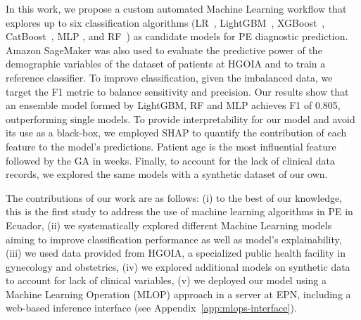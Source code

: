 \documentclass[diagnostics,article,accept,pdftex,moreauthors]{Definitions/mdpi}
\begin{document}
In this work, we propose a custom automated Machine Learning workflow
that explores up to six classification algorithms
(\ac{LR}~\cite{cox1958logistic}, LightGBM~\cite{ke2017lightgbm},
XGBoost~\cite{chen2016xgboost},
CatBoost~\cite{prokhorenkova2018catboost}, 
\ac{MLP} \cite{rumelhart1986backprop}, and
\ac{RF}~\cite{breiman2001randomforest}) as candidate models for
\ac{PE} diagnostic prediction. Amazon SageMaker was also used to
evaluate the predictive power of the demographic variables of the
dataset of patients at \ac{HGOIA} and to train a reference
classifier. To improve classification, given the imbalanced data, we
target the \ac{F1} metric to balance sensitivity and precision. Our
results show that an ensemble model formed by LightGBM, \ac{RF} and
\ac{MLP} achieves \ac{F1} of 0.805, outperforming single models. To
provide interpretability for our model and avoid its use as a
black-box, we employed \ac{SHAP} to quantify the contribution of each
feature to the model's predictions. Patient age is the most
influential feature followed by {the} \ac{GA} %
in weeks. Finally, to account for the lack of clinical data records,
we explored the same models with a synthetic dataset of our own.

The contributions of our work are as follows: (i) to the best of our knowledge,
this is the first study to address the use of machine
learning algorithms in \ac{PE} in Ecuador, (ii) we systematically
explored different Machine Learning models aiming to improve
classification performance as well as model's explainability, (iii) we
used data provided from \ac{HGOIA}, a specialized
public health facility in gynecology and obstetrics, (iv) we explored
additional models on synthetic data to account for lack of clinical
variables, (v) we deployed our model using a Machine Learning Operation (MLOP) approach in a
server at \ac{EPN}, including a web-based inference interface (see
Appendix~\ref{app:mlops-interface}).
\end{document}
